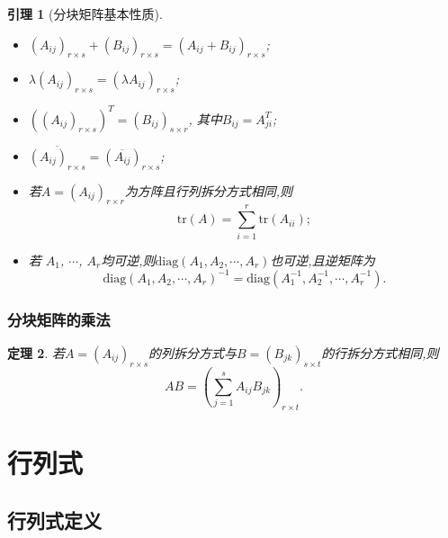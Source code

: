 \documentclass{article}
\newtheorem{theorem}{定理}  %
\newtheorem{lemma}[theorem]{引理}
\begin{document}
\subsubsection{}
\begin{lemma}[分块矩阵基本性质]
\begin{itemize}
\item $(A_{ij})_{r\times s}+(B_{ij})_{r\times s}=(A_{ij}+B_{ij})_{r\times s}$;
\item $\lambda(A_{ij})_{r\times s}=(\lambda A_{ij})_{r\times s}$;
\item $\left((A_{ij})_{r\times s}\right)^T = (B_{ij})_{s\times r}$, 其中$B_{ij}=A_{ji}^T$;
\item $\overline{(A_{ij})_{r\times s}} = (\overline{A_{ij}})_{r\times s}$;
\item 若$A=(A_{ij})_{r\times r}$为方阵且行列拆分方式相同,则
\[\mathrm{tr}(A)=\sum_{i=1}^r\mathrm{tr}(A_{ii});\]
\item 若 $A_1$, $\cdots$, $A_r$均可逆,则$\mathrm{diag}(A_1,A_2,\cdots,A_r)$也可逆,且逆矩阵为
\[\mathrm{diag}(A_1,A_2,\cdots,A_r)^{-1}=\mathrm{diag}(A_1^{-1},A_2^{-1},\cdots,A_r^{-1}).\]
\end{itemize}
\end{lemma}

\subsubsection{分块矩阵的乘法}
\begin{theorem}若$A = (A_{ij})_{r\times s}$的列拆分方式与$B = (B_{jk})_{s\times t}$的行拆分方式相同,则
\[AB = \left(\sum\limits_{j=1}^s A_{ij}B_{jk}\right)_{r\times t}.\]
\end{theorem}
\newpage




\section{行列式}


\subsection{行列式定义}
\end{document}
